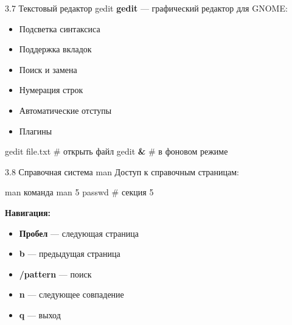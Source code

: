 \documentclass[
  ignorenonframetext,
  aspectratio=169,
  russian,
]{beamer}
\newenvironment{Shaded}{\begin{snugshade}}{\end{snugshade}}
\newcommand{\CommentTok}[1]{\textcolor[rgb]{0.37,0.37,0.37}{#1}}
\newcommand{\ExtensionTok}[1]{\textcolor[rgb]{0.00,0.23,0.31}{#1}}
\newcommand{\FunctionTok}[1]{\textcolor[rgb]{0.28,0.35,0.67}{#1}}
\newcommand{\KeywordTok}[1]{\textcolor[rgb]{0.00,0.23,0.31}{\textbf{#1}}}
\newcommand{\NormalTok}[1]{\textcolor[rgb]{0.00,0.23,0.31}{#1}}
\providecommand{\tightlist}{%
  \setlength{\itemsep}{0pt}\setlength{\parskip}{0pt}}
\begin{document}
\begin{frame}[fragile]{3.7 Текстовый редактор gedit}
\label{ux442ux435ux43aux441ux442ux43eux432ux44bux439-ux440ux435ux434ux430ux43aux442ux43eux440-gedit}
\textbf{gedit} --- графический редактор для GNOME:

\begin{itemize}[<+->]
\tightlist
\item
  Подсветка синтаксиса
\item
  Поддержка вкладок
\item
  Поиск и замена
\item
  Нумерация строк
\item
  Автоматические отступы
\item
  Плагины
\end{itemize}

\begin{Shaded}
\begin{Highlighting}[]
\ExtensionTok{gedit}\NormalTok{ file.txt    }\CommentTok{\# открыть файл}
\ExtensionTok{gedit} \KeywordTok{\&}           \CommentTok{\# в фоновом режиме}
\end{Highlighting}
\end{Shaded}
\end{frame}

\begin{frame}[fragile]{3.8 Справочная система man}
\label{ux441ux43fux440ux430ux432ux43eux447ux43dux430ux44f-ux441ux438ux441ux442ux435ux43cux430-man}
Доступ к справочным страницам:

\begin{Shaded}
\begin{Highlighting}[]
\FunctionTok{man}\NormalTok{ команда}
\FunctionTok{man}\NormalTok{ 5 passwd    }\CommentTok{\# секция 5}
\end{Highlighting}
\end{Shaded}

\textbf{Навигация:}

\begin{itemize}[<+->]
\tightlist
\item
  \textbf{Пробел} --- следующая страница
\item
  \textbf{b} --- предыдущая страница
\item
  \textbf{/pattern} --- поиск
\item
  \textbf{n} --- следующее совпадение
\item
  \textbf{q} --- выход
\end{itemize}
\end{frame}
\end{document}
